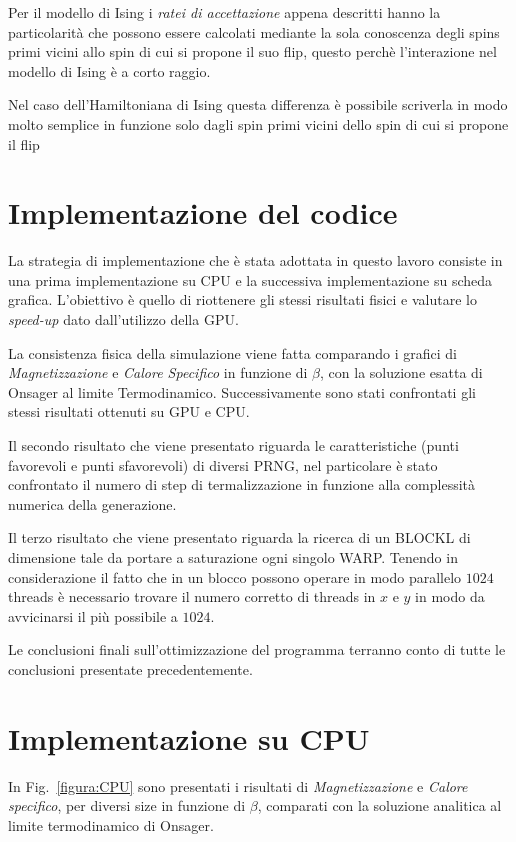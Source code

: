 \documentclass[a4paper,12pt]{article}
\begin{document}
Per il modello di Ising i \emph{ratei di accettazione} appena descritti hanno la particolarit\`a che possono essere calcolati mediante la sola conoscenza degli spins primi vicini allo spin di cui si propone il suo flip, questo perchè l'interazione nel modello di Ising  è a corto raggio. 

Nel caso dell'Hamiltoniana di Ising questa differenza è possibile scriverla in modo molto semplice in funzione solo dagli spin primi vicini dello spin di cui si propone il flip



\section{Implementazione del codice}
La strategia di implementazione che \`e stata adottata in questo lavoro consiste in una prima implementazione su CPU e la successiva implementazione su scheda grafica. L'obiettivo \`e quello di riottenere gli stessi risultati fisici e valutare lo \emph{speed-up} dato dall'utilizzo della GPU. 

La consistenza fisica della simulazione viene fatta comparando i grafici di \emph{Magnetizzazione} e \emph{Calore Specifico} in funzione di $\beta$, con la soluzione esatta di Onsager al limite Termodinamico. Successivamente sono stati confrontati gli stessi risultati ottenuti su GPU e CPU. 

Il secondo risultato che viene presentato riguarda le caratteristiche (punti favorevoli e punti sfavorevoli) di diversi PRNG, nel particolare \`e stato confrontato il numero di step di termalizzazione in funzione alla complessit\`a numerica della generazione. 

Il terzo risultato che viene presentato riguarda la ricerca di un BLOCKL di dimensione tale da portare a saturazione ogni singolo WARP. Tenendo in considerazione il fatto che in un blocco possono operare in modo parallelo $1024$ threads \`e necessario trovare il numero corretto di threads in $x$ e $y$ in modo da avvicinarsi il pi\`u possibile a $1024$.

Le conclusioni finali sull'ottimizzazione del programma terranno conto di tutte le conclusioni presentate precedentemente.

\section{Implementazione su CPU}
In Fig.~\ref{figura:CPU} sono presentati i risultati di \emph{Magnetizzazione} e \emph{Calore specifico}, per diversi size in funzione di $\beta$, comparati con la soluzione analitica al limite termodinamico di Onsager.
\end{document}
